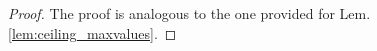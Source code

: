 \begin{lem}
\begin{proof} The proof is analogous to the one provided for Lem. \ref{lem:ceiling_maxvalues}.
%
%
%
%
%
%
%
%
%
%
%
%
  
\end{proof}

\end{lem}

